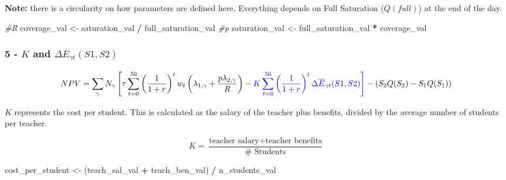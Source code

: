 \documentclass[]{article}
\newenvironment{Shaded}{\begin{snugshade}}{\end{snugshade}}
\newcommand{\CommentTok}[1]{\textcolor[rgb]{0.56,0.35,0.01}{\textit{#1}}}
\newcommand{\NormalTok}[1]{#1}
\newcommand{\OperatorTok}[1]{\textcolor[rgb]{0.81,0.36,0.00}{\textbf{#1}}}
\newcommand{\StringTok}[1]{\textcolor[rgb]{0.31,0.60,0.02}{#1}}
\begin{document}
\textbf{Note:} there is a circularity on how parameters are defined
here. Everything depends on Full Saturation (\(Q(full)\)) at the end of
the day.

\begin{Shaded}
\begin{Highlighting}[]
\CommentTok{#R }
\NormalTok{coverage_val <-}\StringTok{  }\NormalTok{saturation_val }\OperatorTok{/}\StringTok{ }\NormalTok{full_saturation_val}
\CommentTok{#p }
\NormalTok{saturation_val <-}\StringTok{ }\NormalTok{full_saturation_val }\OperatorTok{*}\StringTok{ }\NormalTok{coverage_val}
\end{Highlighting}
\end{Shaded}

\hypertarget{k-and-delta-overlinee_gamma-ts1s2}{%
\subsubsection{\texorpdfstring{5 - \(K\) and
\(\Delta \overline{E}_{\gamma t}(S1,S2)\)}{5 - K and \textbackslash{}Delta \textbackslash{}overline\{E\}\_\{\textbackslash{}gamma t\}(S1,S2)}}\label{k-and-delta-overlinee_gamma-ts1s2}}

\begin{equation}
NPV =  \sum_{\gamma} N_{\gamma} \left[ 
\tau \sum_{t=0}^{50}\left(  \frac{1}{1 + r}\right)^{t} w_{t} 
\left( \lambda_{1, \gamma}  + \frac{p \lambda_{2, \gamma}}{R} \right) - 
\color{blue}{K} \sum_{t=0}^{50} \left( \frac{1}{1 + r}\right)^{t} \color{blue}{ \Delta \overline{E}_{\gamma t}(S1,S2) }
\right] - \left( S_{2}Q(S_{2}) - S_{1}Q(S_{1}) \right)
\end{equation}

\(K\) represents the cost per student. This is calculated as the salary
of the teacher plus benefits, divided by the average number of students
per teacher.

\begin{equation}
K = \frac{\text{teacher salary} + \text{teacher benefits}}{\text{# Students}}
\end{equation}

\begin{Shaded}
\begin{Highlighting}[]
\NormalTok{cost_per_student <-}\StringTok{ }\NormalTok{(teach_sal_val }\OperatorTok{+}\StringTok{ }\NormalTok{teach_ben_val) }\OperatorTok{/}\StringTok{ }\NormalTok{n_students_val}
\end{Highlighting}
\end{Shaded}
\end{document}
